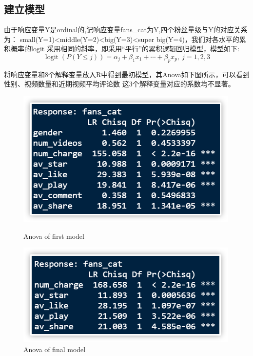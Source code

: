 \documentclass{ctexart}
\begin{document}
\subsection{建立模型}

由于响应变量Y是ordinal的,记响应变量fans\_cat为Y,四个粉丝量级与Y的对应关系为：
small(Y=1)<middle(Y=2)<big(Y=3)<super big(Y=4)，我们对各水平的累积概率的logit
采用相同的斜率，即采用“平行”的累积逻辑回归模型，模型如下:
\begin{equation}
    \operatorname{logit}(P(Y\le j))=\alpha_j+\beta_1x_1+\cdots+\beta_px_p,\ j=1,2,3
\end{equation}


将响应变量和8个解释变量放入R中得到最初模型，其Anova如下图所示，可以看到性别、视频数量和近期视频平均评论数
这3个解释变量对应的系数均不显著。
\begin{figure}[H]
    \centering
    \begin{minipage}[t]{0.48\textwidth}
        \centering
        \includegraphics[width=\textwidth]{MLR/Anova1.png}
        \caption{Anova of first model}
    \end{minipage}
    \begin{minipage}[t]{0.48\textwidth}
        \centering
        \includegraphics[width=\textwidth]{MLR/Anova2.png}
        \caption{Anova of final model}
    \end{minipage}
\end{figure}
\end{document}
